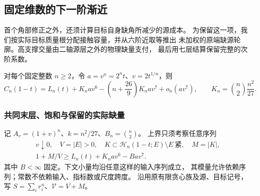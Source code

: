 \subsection{固定维数的下一阶渐近}
\label{seventh:section}

首个角部修正之外，还须计算目标自身缺角所减少的源成本。
为保留这一项，我们按实际目标质量根分配接触容量，并从六阶近取等推出
未加权的原端缺源轮廓。高支撑交量由二轴源层之外的物理缺量支付，
最后用七层结算保留完整的次阶系数。

\begin{theorem}[七阶渐近]\label{seventh:theorem}
对每个固定整数 \(n\ge2\)，令 \(a=v^n=2^nt\)、\(v=2t^{1/n}\)，则
\begin{equation}\label{seventh:asymptotic}
 C_n(1-t)=L_n(t)+K_nav^6-
       \left(n+\frac{26}{9}\right)K_nav^7+o_n(av^7),
 \qquad K_n=\binom n2\frac{n^2}{27}.
\end{equation}
\end{theorem}

\subsubsection{共同末层、饱和与保留的实际缺量}

记 \(A_v=(1+v)^n\)、\(k=n^2/27\)、\(B_n=\binom n2\)。
上界只须考察任意序列
\begin{equation}\label{seventh:critical}
 \begin{gathered}
 v\downarrow0,\quad V=|E|>0,\quad
 K\subset\mathcal H_n(1-t;E)\setminus E\ \text{紧},\quad M=|K|,\\
 1+M/V\ge L_n(t)+K_nav^6-Bav^7.
 \end{gathered}
\end{equation}
其中 \(B<\infty\) 固定。下文小量均沿任意这样的输入序列成立，
其模量允许依赖序列；常数不依赖输入、指标数或尺度跨度。
沿用原有限贪心族及源、目标记号，写 \(S=\sum_i r_i^n\)、\(\mathcal V=V+M\)。

